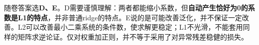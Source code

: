随卷答案选\textbf{D、E}。D需要谨慎理解：两者都能缩小系数，但\textbf{自动产生恰好为0的系数是L1的特点}，并非普通ridge的特点。E说的是可能改善泛化，并不保证一定改善。L2可以改善最小二乘系统的条件数，使求解更稳定；L1不光滑，不能套用同样的矩阵求逆论证。仅对权重加正则，并不等于采用了对异常残差稳健的损失。
